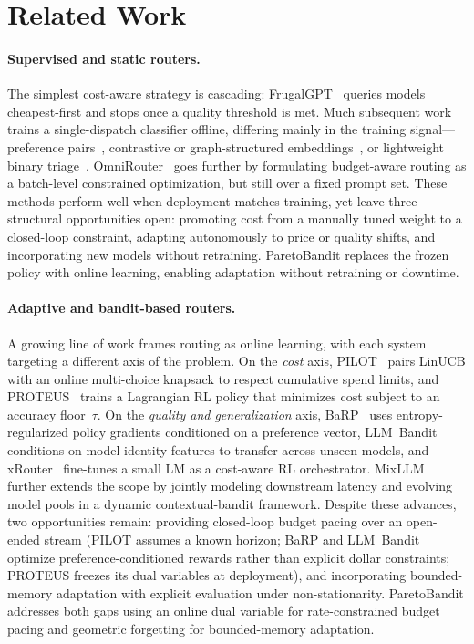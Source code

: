 \section{Related Work}
\label{sec:related}

\begingroup
\setlength{\parskip}{2pt}

\paragraph{Supervised and static routers.}
The simplest cost-aware strategy is cascading: FrugalGPT~\cite{chen2023frugalgpt} queries models cheapest-first and stops once a quality threshold is met. Much subsequent work trains a single-dispatch classifier offline, differing mainly in the training signal---preference pairs~\cite{ong2024routellm}, contrastive or graph-structured embeddings~\cite{chen2024routerdc, shirkavand2025cscr, feng2025graphrouter}, or lightweight binary triage~\cite{ding2024hybridllm, pulishetty2025onehead}. OmniRouter~\cite{mei2025omnirouter} goes further by formulating budget-aware routing as a batch-level constrained optimization, but still over a fixed prompt set.
These methods perform well when deployment matches training, yet leave three structural opportunities open: promoting cost from a manually tuned weight to a closed-loop constraint, adapting autonomously to price or quality shifts, and incorporating new models without retraining.
ParetoBandit replaces the frozen policy with online learning, enabling adaptation without retraining or downtime.

\vspace{-4pt}
\paragraph{Adaptive and bandit-based routers.}
A growing line of work frames routing as online learning, with each system targeting a different axis of the problem.
On the \emph{cost} axis, PILOT~\cite{panda2025pilot} pairs LinUCB with an online multi-choice knapsack to respect cumulative spend limits, and PROTEUS~\cite{bhatti2026proteus} trains a Lagrangian RL policy that minimizes cost subject to an accuracy floor~$\tau$.
On the \emph{quality and generalization} axis, BaRP~\cite{wang2025barp} uses entropy-regularized policy gradients conditioned on a preference vector, LLM~Bandit~\cite{li2025llmbandit} conditions on model-identity features to transfer across unseen models, and xRouter~\cite{qian2025xrouter} fine-tunes a small LM as a cost-aware RL orchestrator.
MixLLM~\cite{wang2025mixllm} further extends the scope by jointly modeling downstream latency and evolving model pools in a dynamic contextual-bandit framework.
Despite these advances, two opportunities remain: providing closed-loop budget pacing over an open-ended stream (PILOT assumes a known horizon; BaRP and LLM~Bandit optimize preference-conditioned rewards rather than explicit dollar constraints; PROTEUS freezes its dual variables at deployment), and incorporating bounded-memory adaptation with explicit evaluation under non-stationarity.
ParetoBandit addresses both gaps using an online dual variable for rate-constrained budget pacing and geometric forgetting for bounded-memory adaptation.

